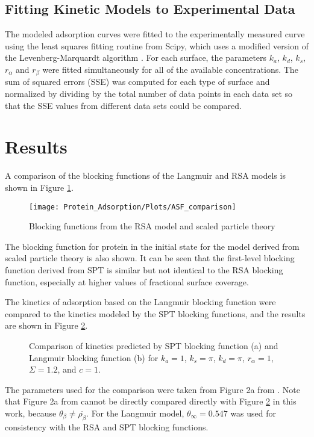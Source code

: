 \subsection{Fitting Kinetic Models to Experimental Data}

The modeled adsorption curves were fitted to the experimentally measured
curve using the least squares fitting routine from Scipy, which uses
a modified version of the Levenberg-Marquardt algorithm \cite{Jones2001-}.
For each surface, the parameters $k_{a}$, $k_{d}$, $k_{s}$, $r_{\alpha}$
and $r_{\beta}$ were fitted simultaneously for all of the available
concentrations. The sum of squared errors (SSE) was computed for each
type of surface and normalized by dividing by the total number of
data points in each data set so that the SSE values from different
data sets could be compared.


\section{Results}

A comparison of the blocking functions of the Langmuir and RSA models
is shown in Figure \ref{fig:Blocking function comparison}.%
\begin{figure}
\texttt{[image: Protein\_Adsorption/Plots/ASF\_comparison]}

\caption{\label{fig:Blocking function comparison}Blocking functions from the
RSA model and scaled particle theory}
%
\end{figure}
 The blocking function for protein in the initial state for the model
derived from scaled particle theory is also shown. It can be seen
that the first-level blocking function derived from SPT is similar
but not identical to the RSA blocking function, especially at higher
values of fractional surface coverage.

The kinetics of adsorption based on the Langmuir blocking function
were compared to the kinetics modeled by the SPT blocking functions,
and the results are shown in Figure \ref{fig:SPT vs Langmuir kinetics}.
%
\begin{figure}[h]

\caption{\label{fig:SPT vs Langmuir kinetics}Comparison of kinetics predicted
by SPT blocking function (a) and Langmuir blocking function (b) for
$k_{a}=1$, $k_{s}=\pi$, $k_{d}=\pi$, $r_{\alpha}=1$, $\Sigma=1.2$,
and $c=1$.}
%
\end{figure}
 The parameters used for the comparison were taken from Figure 2a
from \cite{Brusatori1999}. Note that Figure 2a from \cite{Brusatori1999}
cannot be directly compared directly with Figure \ref{fig:SPT vs Langmuir kinetics}
in this work, because $\theta_{\beta}\neq\overline{\rho_{\beta}}$.
For the Langmuir model, $\theta_{\infty}=0.547$ was used for consistency
with the RSA and SPT blocking functions.


